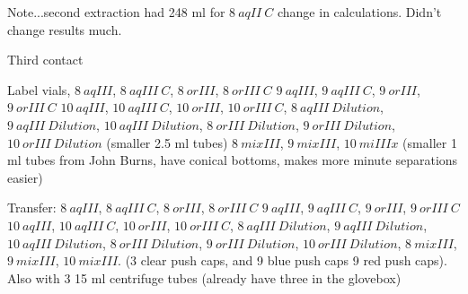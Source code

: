 \documentclass[idxtotoc,hyperref,openany,oneside]{labbook} %
\newcommand{\cmark}{\ding{51}}%
\newcommand{\done}{\rlap{$\square$}{\raisebox{2pt}{\large\hspace{1pt}\cmark}}%
  \hspace{-2.5pt}}
\begin{document}
Note...second extraction had 248 ml for $\boxed{8\ aqII\ C}$
change in calculations. Didn't change results much.


Third contact

\begin{todolist}

\item[\done]{Label vials,
  $\boxed{8\ aqIII}$,  $\boxed{8\ aqIII\ C}$,  $\boxed{8\ orIII}$,
  $\boxed{8\ orIII\ C}$
  $\boxed{9\ aqIII}$,  $\boxed{9\ aqIII\ C}$,  $\boxed{9\ orIII}$,
  $\boxed{9\ orIII\ C}$
  $\boxed{10\ aqIII}$, $\boxed{10\ aqIII\ C}$, $\boxed{10\ orIII}$,
  $\boxed{10\ orIII\ C}$,
  $\boxed{8\ aqIII\ Dilution}$,
  $\boxed{9\ aqIII\ Dilution}$,
  $\boxed{10\ aqIII\ Dilution}$,
  $\boxed{8\ orIII\ Dilution}$,
  $\boxed{9\ orIII\ Dilution}$,
  $\boxed{10\ orIII\ Dilution}$ (smaller 2.5 ml tubes)
  $\boxed{8\ mixIII}$, $\boxed{9\ mixIII}$,
    $\boxed{10\ miIIIx}$ (smaller 1 ml tubes from John Burns,
    have conical bottoms, makes more minute separations easier)}

\item{Transfer:
  $\boxed{8\ aqIII}$,  $\boxed{8\ aqIII\ C}$,  $\boxed{8\ orIII}$,
  $\boxed{8\ orIII\ C}$
  $\boxed{9\ aqIII}$,  $\boxed{9\ aqIII\ C}$,  $\boxed{9\ orIII}$,
  $\boxed{9\ orIII\ C}$
  $\boxed{10\ aqIII}$, $\boxed{10\ aqIII\ C}$, $\boxed{10\ orIII}$,
  $\boxed{10\ orIII\ C}$,
    $\boxed{8\ aqIII\ Dilution}$,
  $\boxed{9\ aqIII\ Dilution}$,
  $\boxed{10\ aqIII\ Dilution}$,
  $\boxed{8\ orIII\ Dilution}$,
  $\boxed{9\ orIII\ Dilution}$,
  $\boxed{10\ orIII\ Dilution}$,
  $\boxed{8\ mixIII}$, $\boxed{9\ mixIII}$,
  $\boxed{10\ mixIII}$.
  (3 clear push caps, and 9 blue push caps
  9 red push caps). Also with 3 15 ml centrifuge tubes (already
  have three in the glovebox)}


\end{todolist}
\end{document}
